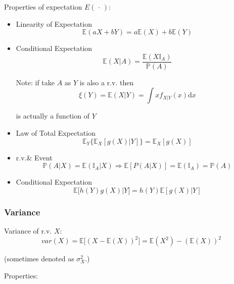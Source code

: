 \begin{point}
        Properties of expectation $E(\,\cdot\,)$:
\end{point}

\begin{itemize}
    \item Linearity of Expectation\begin{equation}
        \mathbb{E}(aX+bY)=a \mathbb{E}(X)+b\mathbb{E}(Y)
    \end{equation}
    \item Conditional Expectation\begin{equation}
        \mathbb{E}(X|A)=\frac{\mathbb{E}(X\mathbb{I}_A)}{\mathbb{P}(A)}
    \end{equation}
    
    Note: if take $A$ as $Y$ is also a r.v. then 
    \begin{equation}\xi (Y)=\mathbb{E}(X|Y)=\int xf_{X|Y}(x)\mathrm{d}x\end{equation}

    is actually a function of $Y$

    \item Law of Total Expectation\begin{equation}
        \mathbb{E}_Y\big\{\mathbb{E}_X[g(X)|Y]\big\}=\mathbb{E}_X[g(X)]
    \end{equation}
    \item r.v.\& Event
    \begin{equation}
        \mathbb{P}(A|X)=\mathbb{E}(\mathbb{I}_A|X)\Rightarrow \mathbb{E}[P(A|X)]=\mathbb{E}(\mathbb{I}_A)=\mathbb{P}(A)
    \end{equation}
    \item Conditional Expectation
    \begin{equation}
        \mathbb{E}\big[h(Y)g(X)|Y\big]=h(Y)\mathbb{E}[g(X)|Y]
    \end{equation}
\end{itemize}


\subsubsection{Variance}
    Variance of r.v. $X$: 
    \begin{equation}
        var(X)=\mathbb{E}\big[(X-\mathbb{E}(X))^2\big]=\mathbb{E}(X^2)-(\mathbb{E}(X))^2
    \end{equation}

    (sometimes denoted as $\sigma^2_X$.)

\begin{point}
    Properties:
\end{point}

